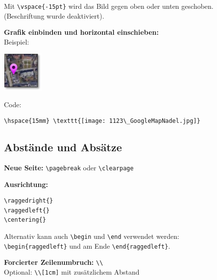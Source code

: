 Mit \verb+\vspace{-15pt}+ wird das Bild gegen oben oder unten geschoben. (Beschriftung wurde deaktiviert).

\vspace{\baselineskip}

\textbf{Grafik einbinden und horizontal einschieben:}\\

Beispiel:

\hspace{15mm} \includegraphics[height=20mm]{../pictures/kleinesBild.jpg}

Code:

\begin{verbatim}
\hspace{15mm} \texttt{[image: 1123\_GoogleMapNadel.jpg]}
\end{verbatim}




\subsection{Abstände und Absätze}

\textbf{Neue Seite:}
\verb+\pagebreak+ oder \verb+\clearpage+

\vspace{\baselineskip}

\textbf{Ausrichtung:}

\begin{verbatim}
\raggedright{}
\raggedleft{}
\centering{}
\end{verbatim}

Alternativ kann auch \verb+\begin+ und \verb+\end+ verwendet werden:\\
\verb+\begin{raggedleft}+ und am Ende \verb+\end{raggedleft}+.

\vspace{\baselineskip}

\textbf{Forcierter Zeilenumbruch:} \verb+\\+\\
Optional: \verb+\\[1cm]+ mit zusätzlichem Abstand

